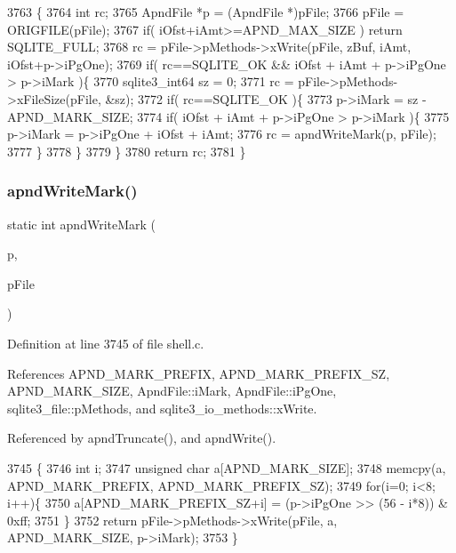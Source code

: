\begin{DoxyCode}
3763  \{
3764   \textcolor{keywordtype}{int} rc;
3765   ApndFile *p = (ApndFile *)pFile;
3766   pFile = ORIGFILE(pFile);
3767   \textcolor{keywordflow}{if}( iOfst+iAmt>=APND_MAX_SIZE ) \textcolor{keywordflow}{return} SQLITE_FULL;
3768   rc = pFile->pMethods->xWrite(pFile, zBuf, iAmt, iOfst+p->iPgOne);
3769   \textcolor{keywordflow}{if}( rc==SQLITE_OK &&  iOfst + iAmt + p->iPgOne > p->iMark )\{
3770     sqlite3_int64 sz = 0;
3771     rc = pFile->pMethods->xFileSize(pFile, &sz);
3772     \textcolor{keywordflow}{if}( rc==SQLITE_OK )\{
3773       p->iMark = sz - APND_MARK_SIZE;
3774       \textcolor{keywordflow}{if}( iOfst + iAmt + p->iPgOne > p->iMark )\{
3775         p->iMark = p->iPgOne + iOfst + iAmt;
3776         rc = apndWriteMark(p, pFile);
3777       \}
3778     \}
3779   \}
3780   \textcolor{keywordflow}{return} rc;
3781 \}
\end{DoxyCode}
\mbox{\label{shell_8c_a00b0e903a410cc1b39c14574abd67387}} 
\subsubsection{apnd\+Write\+Mark()}
{\footnotesize\ttfamily static int apnd\+Write\+Mark (\begin{DoxyParamCaption}\item[{\textbf{ Apnd\+File} $\ast$}]{p,  }\item[{\textbf{ sqlite3\+\_\+file} $\ast$}]{p\+File }\end{DoxyParamCaption})\hspace{0.3cm}{\ttfamily [static]}}



Definition at line 3745 of file shell.\+c.



References A\+P\+N\+D\+\_\+\+M\+A\+R\+K\+\_\+\+P\+R\+E\+F\+IX, A\+P\+N\+D\+\_\+\+M\+A\+R\+K\+\_\+\+P\+R\+E\+F\+I\+X\+\_\+\+SZ, A\+P\+N\+D\+\_\+\+M\+A\+R\+K\+\_\+\+S\+I\+ZE, Apnd\+File\+::i\+Mark, Apnd\+File\+::i\+Pg\+One, sqlite3\+\_\+file\+::p\+Methods, and sqlite3\+\_\+io\+\_\+methods\+::x\+Write.



Referenced by apnd\+Truncate(), and apnd\+Write().


\begin{DoxyCode}
3745                                                           \{
3746   \textcolor{keywordtype}{int} i;
3747   \textcolor{keywordtype}{unsigned} \textcolor{keywordtype}{char} a[APND_MARK_SIZE];
3748   memcpy(a, APND_MARK_PREFIX, APND_MARK_PREFIX_SZ);
3749   \textcolor{keywordflow}{for}(i=0; i<8; i++)\{
3750     a[APND_MARK_PREFIX_SZ+i] = (p->iPgOne >> (56 - i*8)) & 0xff;
3751   \}
3752   \textcolor{keywordflow}{return} pFile->pMethods->xWrite(pFile, a, APND_MARK_SIZE, p->iMark);
3753 \}
\end{DoxyCode}
\mbox{\label{shell_8c_a27a1507709a310ba8da26cbdaead66fd}} 
